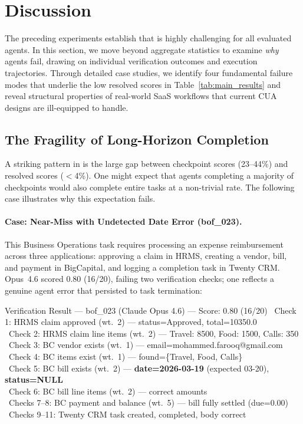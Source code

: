 \section{Discussion}
\label{disc}

The preceding experiments establish that \datasetname is highly challenging for all evaluated agents. In this section, we move beyond aggregate statistics to examine \emph{why} agents fail, drawing on individual verification outcomes and execution trajectories. Through detailed case studies, we identify four fundamental failure modes that underlie the low resolved scores in Table~\ref{tab:main_results} and reveal structural properties of real-world SaaS workflows that current CUA designs are ill-equipped to handle.

\subsection{The Fragility of Long-Horizon Completion}
\label{disc-nearmiss}

A striking pattern in \datasetname is the large gap between checkpoint scores (23--44\%) and resolved scores ($<$4\%). One might expect that agents completing a majority of checkpoints would also complete entire tasks at a non-trivial rate. The following case illustrates why this expectation fails.

\paragraph{Case: Near-Miss with Undetected Date Error ({\ttfamily bof\_023}).}
This Business Operations task requires processing an expense reimbursement across three applications: approving a claim in HRMS, creating a vendor, bill, and payment in BigCapital, and logging a completion task in Twenty CRM. Opus~4.6 scored 0.80 (16/20), failing two verification checks; one reflects a genuine agent error that persisted to task termination:

\begin{verifybox}{Verification Result --- {\ttfamily bof\_023} (Claude Opus 4.6) --- Score: 0.80 (16/20)}
\small
\cmark\ Check 1: HRMS claim approved (wt.\ 2) --- status=Approved, total=10350.0 \\
\cmark\ Check 2: HRMS claim line items (wt.\ 2) --- Travel: 8500, Food: 1500, Calls: 350 \\
\cmark\ Check 3: BC vendor exists (wt.\ 1) --- email=mohammed.farooq@gmail.com \\
\cmark\ Check 4: BC items exist (wt.\ 1) --- found=\{Travel, Food, Calls\} \\
\xmark\ Check 5: BC bill exists (wt.\ 2) --- \textbf{date=2026-03-19} (expected 03-20), \textbf{status=NULL} \\
\cmark\ Check 6: BC bill line items (wt.\ 2) --- correct amounts \\
\cmark\ Checks 7--8: BC payment and balance (wt.\ 5) --- bill fully settled (due=0.00) \\
\cmark\ Checks 9--11: Twenty CRM task created, completed, body correct
\end{verifybox}

